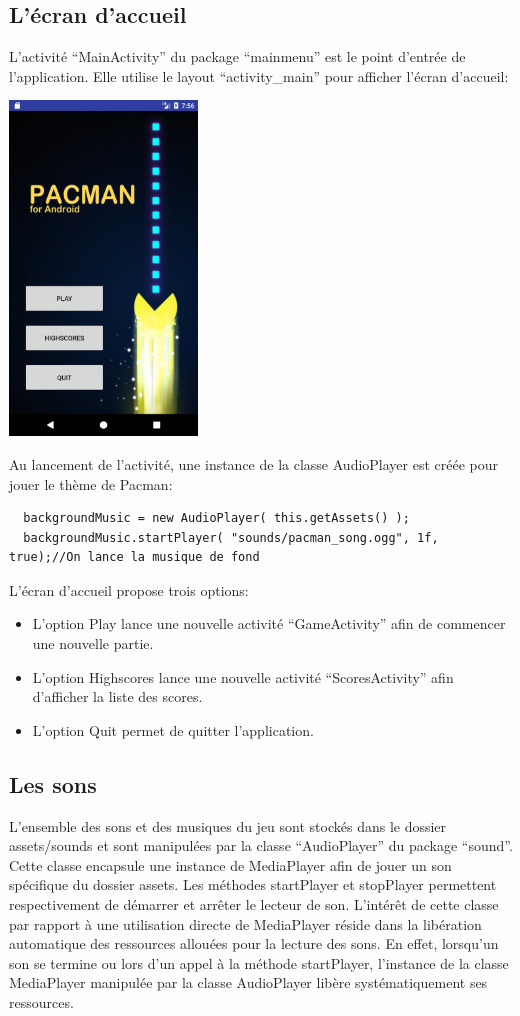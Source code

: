 \documentclass{article}
\begin{document}
\subsection{L'écran d'accueil}
L'activité \enquote{MainActivity} du package \enquote{mainmenu} est le point d'entrée de l'application. 
Elle utilise le layout \enquote{activity\_main} pour afficher l'écran d'accueil:
\begin{center}
  \includegraphics[width=5cm]{home_screen.png}
\end{center}
Au lancement de l'activité, une instance de la classe AudioPlayer est créée pour jouer le thème de Pacman:
\begin{verbatim}
  backgroundMusic = new AudioPlayer( this.getAssets() );
  backgroundMusic.startPlayer( "sounds/pacman_song.ogg", 1f, true);//On lance la musique de fond
\end{verbatim}
L'écran d'accueil propose trois options:
\begin{itemize}
  \item L'option Play lance une nouvelle activité \enquote{GameActivity} afin de commencer une nouvelle partie.
  \item L'option Highscores lance une nouvelle activité \enquote{ScoresActivity} afin d'afficher la liste des scores.
  \item L'option Quit permet de quitter l'application.
\end{itemize}

\subsection{Les sons}
L'ensemble des sons et des musiques du jeu sont stockés dans le dossier assets/sounds et sont manipulées par la classe \enquote{AudioPlayer} du package \enquote{sound}.
Cette classe encapsule une instance de MediaPlayer afin de jouer un son spécifique du dossier assets.
Les méthodes startPlayer et stopPlayer permettent respectivement de démarrer et arrêter le lecteur de son.
L'intérêt de cette classe par rapport à une utilisation directe de MediaPlayer réside dans la libération automatique des ressources allouées pour la lecture des sons.
En effet, lorsqu'un son se termine ou lors d'un appel à la méthode startPlayer, l'instance de la classe MediaPlayer manipulée par la classe AudioPlayer libère systématiquement ses ressources. 
\end{document}
